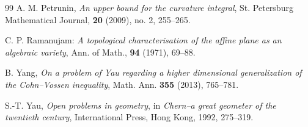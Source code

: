 \documentclass[11pt]{amsart}
\numberwithin{equation}{section}
\theoremstyle{plain}
\theoremstyle{remark}
\begin{document}
\begin{thebibliography}{99}
  A. M. Petrunin, {\em An upper bound for the curvature integral},  {\sc St. Petersburg Mathematical Journal},  {\bf 20} (2009), no. 2, 255--265.

 C. P.  Ramanujam:  \textit{A topological characterisation of the affine plane as an algebraic
 variety}, {\sc Ann. of Math.}, \textbf{94} (1971), 69–88.

B. Yang,
\emph{On a problem of Yau regarding a higher dimensional generalization of the Cohn--Vossen inequality},
Math. Ann. \textbf{355} (2013), 765--781.


S.-T. Yau,
\emph{Open problems in geometry},
in \emph{Chern--a great geometer of the twentieth century}, International Press, Hong Kong, 1992, 275--319.




\end{thebibliography}
\end{document}
